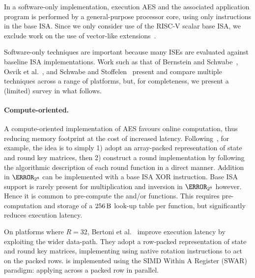 
In a software-only implementation,
execution
AES
and
the associated application program
is 
performed by 
a general-purpose processor core, using only instructions in the base ISA.
Since we only consider use of the RISC-V scalar base ISA, we exclude work on
the use of vector-like extensions~\cite{Hamburg:09}.

Software-only techniques are important because 
many ISEs are evaluated against baseline ISA implementations.
Work such as that of
Bernstein and Schwabe~\cite{BerSch:08},
Osvik et al.~\cite{OBSC:10},
and
Schwabe and Stoffelen~\cite{SchSto:16}
present and compare multiple techniques across a range of platforms, but,
for completeness, we present a (limited) survey in what follows.


\paragraph{Compute-oriented.}

A compute-oriented implementation of AES favours
 online     computation, 
thus reducing 
memory footprint
at the cost of increased 
latency.
Following~\cite[Section 4.1]{DaeRij:02}, for example, the idea is to simply
1) adopt an
    array-packed
   representation of state and round key matrices,
   then
2) construct a round implementation by following the algorithmic description
   of each round function in a direct manner.
Addition in $\F_{2^8}$ can be implemented with a base ISA XOR instruction.
Base ISA support is rarely present for multiplication and inversion in
$\F_{2^8}$ however.
Hence it is common to pre-compute the  and/or  
functions.
This requires pre-computation and storage of a
$
\SI{256}{\byte}
$
look-up table per function, but significantly reduces execution latency.

On platforms where $R = 32$,
Bertoni et al.~\cite{BBFMM:02}
improve execution latency by exploiting the wider data-path.
They adopt a row-packed representation of state and round key matrices,
implementing
using native rotation instructions to act on the packed rows.
 is implemented
using the SIMD Within A Register (SWAR) paradigm:
applying
across a packed row in parallel.


